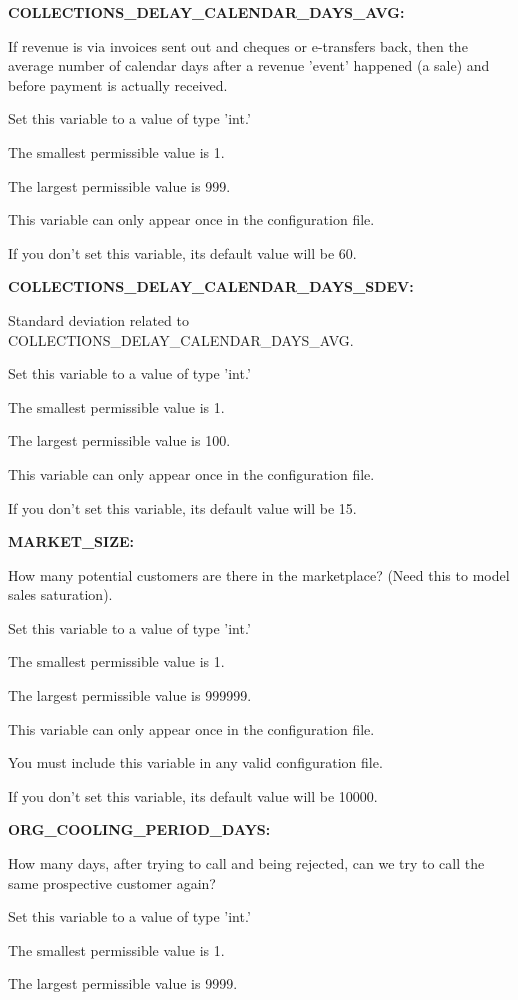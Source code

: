 \textbf{COLLECTIONS\_DELAY\_CALENDAR\_DAYS\_AVG:}


If revenue is via invoices sent out and cheques or e-transfers back, then the average number of calendar days after a revenue 'event' happened (a sale) and before payment is actually received.

Set this variable to a value of type 'int.'

The smallest permissible value is 1.

The largest permissible value is 999.

This variable can only appear once in the configuration file.

If you don't set this variable, its default value will be 60.


\textbf{COLLECTIONS\_DELAY\_CALENDAR\_DAYS\_SDEV:}


Standard deviation related to COLLECTIONS\_DELAY\_CALENDAR\_DAYS\_AVG.

Set this variable to a value of type 'int.'

The smallest permissible value is 1.

The largest permissible value is 100.

This variable can only appear once in the configuration file.

If you don't set this variable, its default value will be 15.


\textbf{MARKET\_SIZE:}


How many potential customers are there in the marketplace?  (Need this to model sales saturation).

Set this variable to a value of type 'int.'

The smallest permissible value is 1.

The largest permissible value is 999999.

This variable can only appear once in the configuration file.

You must include  this variable in any valid configuration file.

If you don't set this variable, its default value will be 10000.


\textbf{ORG\_COOLING\_PERIOD\_DAYS:}


How many days, after trying to call and being rejected, can we try to call the same prospective customer again?

Set this variable to a value of type 'int.'

The smallest permissible value is 1.

The largest permissible value is 9999.

